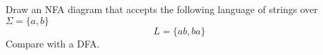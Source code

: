 Draw an NFA diagram that accepts the following
language of strings over $\Sigma =
\{ a, b \}$ 
\[
L = \{ab, ba\}
\]
Compare with a DFA.
